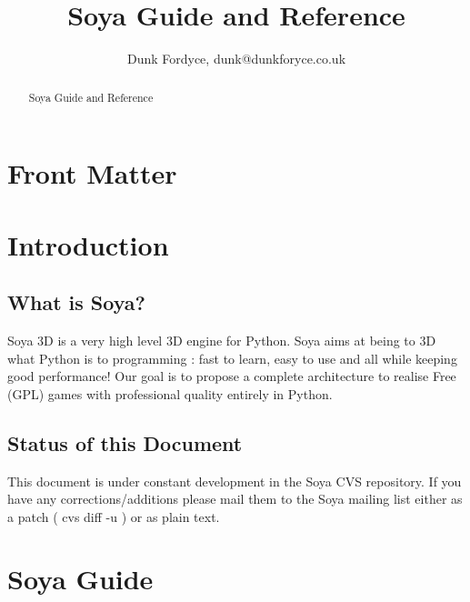 \documentclass{manual}
\title{Soya Guide and Reference}
\author{Dunk Fordyce, dunk@dunkforyce.co.uk}
\begin{document}
\maketitle

\ifhtml
\chapter*{Front Matter\label{front}}
\fi

\begin{abstract}
Soya Guide and Reference
\end{abstract}

\tableofcontents
 
\chapter{Introduction}

\section{What is Soya?}

Soya 3D is a very high level 3D engine for Python. Soya aims at being to 3D what 
Python is to programming : fast to learn, easy to use and all while keeping good 
performance! Our goal is to propose a complete architecture to realise Free (GPL) 
games with professional quality entirely in Python. 

\section{Status of this Document}
This document is under constant development in the Soya CVS repository. 
If you have any corrections/additions please mail them to the Soya 
mailing list either as a patch ( cvs diff -u ) or as plain text.

\chapter{Soya Guide}












\end{document}

